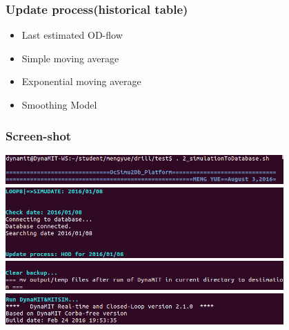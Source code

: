 \documentclass[12pt]{beamer}
\begin{document}
\begin{frame}
\frametitle{Update process(historical table)}

\begin{itemize}
\item Last estimated OD-flow
\item Simple moving average
\item Exponential moving average
\item Smoothing Model
\end{itemize}
\end{frame}


\begin{frame}
\frametitle{Screen-shot}
\includegraphics[width = 0.8\textwidth]{scst_1.png}
\vspace{0.1in}
\includegraphics[width = 0.8\textwidth]{scst_2.png}
\vspace{0.1in}
\includegraphics[width = 0.8\textwidth]{scst_3.png}
\vspace{0.1in}
\includegraphics[width = 0.8\textwidth]{scst_4.png}
\end{frame}
\end{document}
